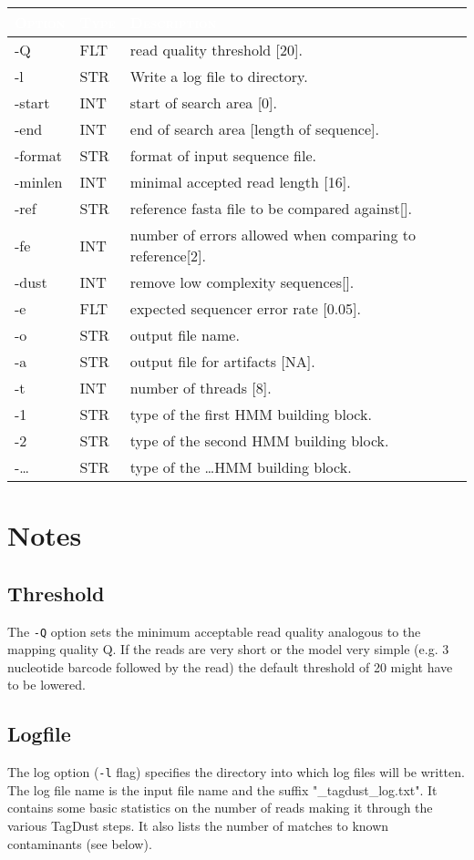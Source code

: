 \documentclass[11pt,a4paper,oneside]{book}
\begin{document}
\begin{center}
\begin{tabular}{| l | l | p{12cm}|}
\hline
\rowcolor{blue} \textcolor{white}{\scshape Option}		&\textcolor{white}{\scshape Type}		&	\textcolor{white}{\scshape Description}\\ \hline
-Q & FLT & read quality threshold [20].\\
-l & STR & Write a log file to directory.\\
-start & INT & start of search area [0].\\
-end & INT & end of  search area [length of sequence].\\
-format & STR & format of input sequence file.\\
-minlen & INT & minimal accepted read length [16].\\
-ref     &  STR &    reference fasta file to be compared against[].\\
-fe &       INT &    number of errors allowed when comparing to reference[2].\\
-dust &	INT &	remove low complexity sequences[].\\
-e & FLT & expected sequencer error rate [0.05].\\ 
-o & STR & output file name.\\
-a & STR & output file for artifacts [NA].\\
-t & INT & number of threads [8].\\
-1 & STR & type of the first HMM building block. \\
-2 & STR & type of the second HMM building block.\\
-\dots & STR & type of the \dots HMM building block.\\
\hline
\end{tabular}
\end{center}
\section{Notes}
\subsection{Threshold}
The {\tt -Q} option sets the minimum acceptable read quality analogous to the mapping quality Q. If the reads are very short or the model very simple (e.g. 3 nucleotide barcode followed by the read) the default threshold of 20 might have to be lowered.

\subsection{Logfile}
The log option ({\tt -l} flag) specifies the directory into which log files will be written. The log file name is the input file name and the suffix  "\_tagdust\_log.txt". It contains some basic statistics on the number of reads making it through the various TagDust steps. It also lists the number of matches to known contaminants (see below).  
\end{document}
